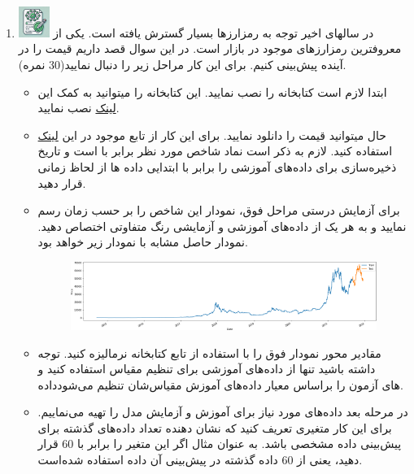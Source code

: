 \documentclass[12pt]{article}
\begin{document}
\begin{enumerate}
    \item \includegraphics[width=1cm]{figs/Allowed_with_contributino.jpg}
    در سالهای اخیر توجه به رمزارزها بسیار گسترش یافته است. یکی از معروفترین رمزارزهای موجود در بازار  است. در این سوال قصد داریم قیمت  را در آینده پیش‌بینی کنیم. برای این کار مراحل زیر را دنبال نمایید(30 نمره).\\
    \begin{itemize}
        \item   ابتدا لازم است کتابخانه  را نصب نمایید. این کتابخانه را میتوانید به کمک این \href{https://pypi.org/project/yfinance/}{لینک} نصب نمایید.
        \item   حال میتوانید قیمت  را دانلود نمایید. برای این کار از تابع  موجود در این \href{https://github.com/ranaroussi/yfinance}{لینک} استفاده کنید. لازم به ذکر است نماد شاخص مورد نظر برابر با  است و تاریخ ذخیره‌سازی برای داده‌های آموزشی را برابر با  ابتدایی داده ها از لحاظ زمانی قرار دهید.
        \item برای آزمایش درستی مراحل فوق، نمودار این شاخص را بر حسب زمان رسم نمایید و به هر یک از داده‌های آموزشی و آزمایشی رنگ متفاوتی اختصاص دهید. نمودار حاصل مشابه با نمودار زیر خواهد بود.
        \begin{figure}[h]  
            \centering
            \includegraphics[width=\textwidth]{figs/Q6_1.png}
            \label{fig:num_pic}  
        \end{figure}
        \item   مقادیر محور  نمودار فوق را با استفاده از تابع  کتابخانه  نرمالیزه کنید. توجه داشته باشید تنها از داده‌های آموزشی برای تنظیم مقیاس استفاده کنید و داده‎‌های آزمون را براساس معیار داده‌های آموزش مقیاس‌شان تنظیم می‌شود.
        \item   در مرحله بعد داده‌های مورد نیاز برای آموزش و آزمایش مدل را تهیه می‌نماییم. برای این کار متغیری تعریف کنید که نشان دهنده تعداد داده‌های گذشته برای پیش‌بینی داده مشخصی باشد. به عنوان مثال اگر این متغیر را برابر با 60 قرار دهید، یعنی از 60 داده گذشته در پیش‌بینی آن داده استفاده شده‌است.

\end{itemize}
\end{enumerate}
\end{document}
